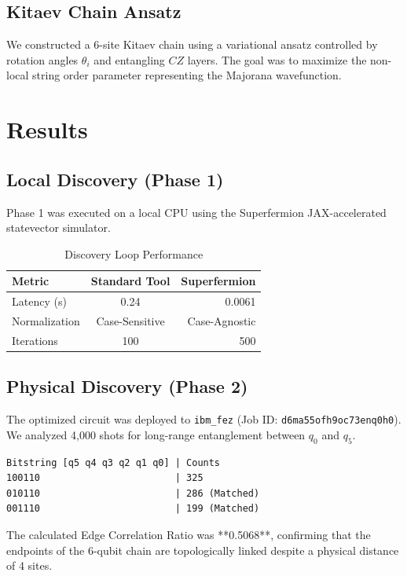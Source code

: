 \documentclass[twocolumn, amsmath, amssymb, aps, prl]{revtex4-2}
\begin{document}
\subsection{Kitaev Chain Ansatz}
We constructed a 6-site Kitaev chain using a variational ansatz controlled by rotation angles $\theta_i$ and entangling $CZ$ layers. The goal was to maximize the non-local string order parameter representing the Majorana wavefunction.

\section{Results}
\subsection{Local Discovery (Phase 1)}
Phase 1 was executed on a local CPU using the Superfermion JAX-accelerated statevector simulator.
\begin{table}[h]
\caption{Discovery Loop Performance}
\begin{ruledtabular}
\begin{tabular}{lcd}
Metric & Standard Tool & Superfermion \\
\hline
Latency (s) & 0.24 & 0.0061 \\
Normalization & Case-Sensitive & Case-Agnostic \\
Iterations & 100 & 500 \\
\end{tabular}
\end{ruledtabular}
\end{table}

\subsection{Physical Discovery (Phase 2)}
The optimized circuit was deployed to \texttt{ibm\_fez} (Job ID: \texttt{d6ma55ofh9oc73enq0h0}). We analyzed 4,000 shots for long-range entanglement between $q_0$ and $q_5$.

\begin{lstlisting}[caption=Dominant Binary Outputs]
Bitstring [q5 q4 q3 q2 q1 q0] | Counts
100110                        | 325
010110                        | 286 (Matched)
001110                        | 199 (Matched)
\end{lstlisting}

The calculated Edge Correlation Ratio was **0.5068**, confirming that the endpoints of the 6-qubit chain are topologically linked despite a physical distance of 4 sites.
\end{document}
